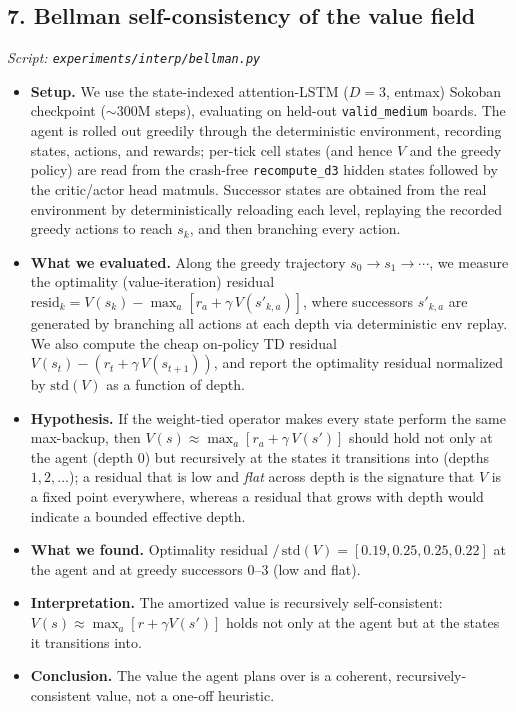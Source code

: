 \documentclass[11pt]{article}
\begin{document}
\subsection*{7. Bellman self-consistency of the value field}
\textit{Script: \texttt{experiments/interp/bellman.py}}
\begin{itemize}
\item \textbf{Setup.} We use the state-indexed attention-LSTM ($D=3$, entmax) Sokoban checkpoint ($\sim$300M steps), evaluating on held-out \texttt{valid\_medium} boards. The agent is rolled out greedily through the deterministic environment, recording states, actions, and rewards; per-tick cell states (and hence $V$ and the greedy policy) are read from the crash-free \texttt{recompute\_d3} hidden states followed by the critic/actor head matmuls. Successor states are obtained from the real environment by deterministically reloading each level, replaying the recorded greedy actions to reach $s_k$, and then branching every action.
\item \textbf{What we evaluated.} Along the greedy trajectory $s_0\to s_1\to\cdots$, we measure the optimality (value-iteration) residual $\mathrm{resid}_k = V(s_k) - \max_a[r_a + \gamma\,V(s'_{k,a})]$, where successors $s'_{k,a}$ are generated by branching all actions at each depth via deterministic env replay. We also compute the cheap on-policy TD residual $V(s_t) - (r_t + \gamma\,V(s_{t+1}))$, and report the optimality residual normalized by $\mathrm{std}(V)$ as a function of depth.
\item \textbf{Hypothesis.} If the weight-tied operator makes every state perform the same max-backup, then $V(s)\approx\max_a[r_a + \gamma\,V(s')]$ should hold not only at the agent (depth $0$) but recursively at the states it transitions into (depths $1,2,\dots$); a residual that is low and \emph{flat} across depth is the signature that $V$ is a fixed point everywhere, whereas a residual that grows with depth would indicate a bounded effective depth.
\item \textbf{What we found.} Optimality residual $/\,\mathrm{std}(V)=[0.19,0.25,0.25,0.22]$ at the agent and at greedy successors $0$--$3$ (low and flat).
\item \textbf{Interpretation.} The amortized value is recursively self-consistent: $V(s)\approx\max_a[r+\gamma V(s')]$ holds not only at the agent but at the states it transitions into.
\item \textbf{Conclusion.} The value the agent plans over is a coherent, recursively-consistent value, not a one-off heuristic.
\end{itemize}
\clearpage
\end{document}
